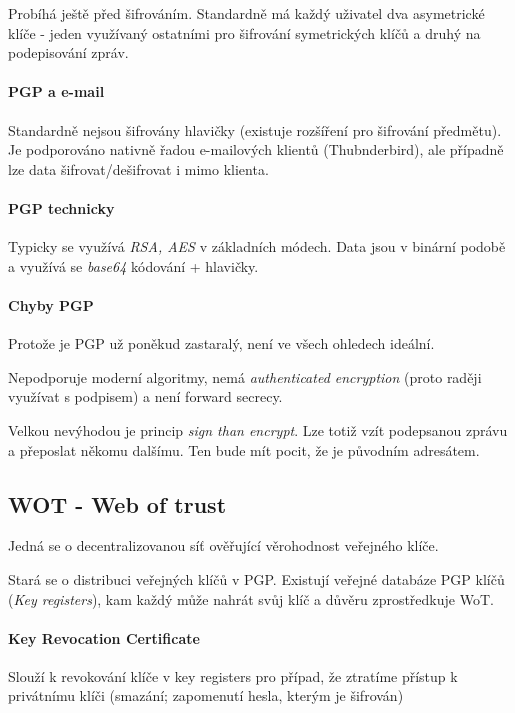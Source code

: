 \documentclass[10pt,a4paper]{article}
\begin{document}
Probíhá ještě před šifrováním. 
Standardně má každý uživatel dva asymetrické klíče - jeden využívaný ostatními pro šifrování symetrických klíčů a druhý na podepisování zpráv.

\paragraph{PGP a e-mail}
Standardně nejsou šifrovány hlavičky (existuje rozšíření pro šifrování předmětu).
Je podporováno nativně řadou e-mailových klientů (Thubnderbird), ale případně lze data šifrovat/dešifrovat i mimo klienta.

\paragraph{PGP technicky}
Typicky se využívá \textit{RSA, AES} v základních módech. 
Data jsou v binární podobě a využívá se \textit{base64} kódování + hlavičky.

\paragraph{Chyby PGP}
Protože je PGP už poněkud zastaralý, není ve všech ohledech ideální.

Nepodporuje moderní algoritmy, nemá \textit{authenticated encryption} (proto raději využívat s podpisem) a není forward secrecy.

Velkou nevýhodou je princip \textit{sign than encrypt}. 
Lze totiž vzít podepsanou zprávu a přeposlat někomu dalšímu. 
Ten bude mít pocit, že je původním adresátem.


\subsection{WOT - Web of trust}
Jedná se o decentralizovanou síť ověřující věrohodnost veřejného klíče.


Stará se o distribuci veřejných klíčů v PGP. 
Existují veřejné databáze PGP klíčů (\textit{Key registers}), kam každý může nahrát svůj klíč a důvěru zprostředkuje WoT.

\paragraph{Key Revocation Certificate}

Slouží k revokování klíče v key registers pro případ, že ztratíme přístup k privátnímu klíči (smazání; zapomenutí hesla, kterým je šifrován)
\end{document}
